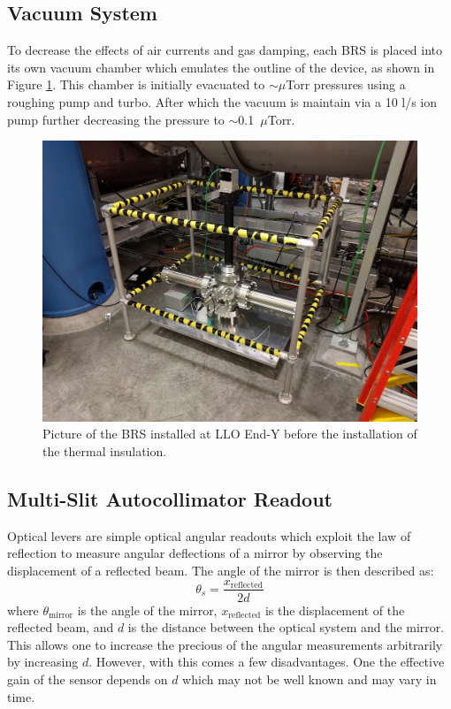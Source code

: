 \documentclass [12pt, proquest]{uwthesis}[2019]
\begin{document}
\subsection{Vacuum System}

To decrease the effects of air currents and gas damping, each BRS is placed into its own vacuum chamber which emulates the outline of the device, as shown in Figure \ref{BRSPic}. This chamber is initially evacuated to $\sim \mu$Torr pressures using a roughing pump and turbo. After which the vacuum is maintain via a 10 l/s ion pump further decreasing the pressure to $\sim$0.1~$\mu$Torr.

\begin{figure}[!h]
\begin{center}
 \includegraphics[width=\textwidth]{BRSPic.jpg}
\caption[Picture of an installed BRS]{Picture of the BRS installed at LLO End-Y before the installation of the thermal insulation.}
\label{BRSPic}
\end{center}
\end{figure}

\subsection{Multi-Slit Autocollimator Readout}

\quad Optical levers are simple optical angular readouts which exploit the law of reflection to measure angular deflections of a mirror by observing the displacement of a reflected beam. The angle of the mirror is then described as:
\begin{equation}
\theta_{s}=\frac{x_{\text{reflected}}}{2d}
\end{equation}
where $\theta_\text{mirror}$ is the angle of the mirror, $x_\text{reflected}$ is the displacement of the reflected beam, and $d$ is the distance between the optical system and the mirror. This allows one to increase the precious of the angular measurements arbitrarily by increasing $d$. However, with this comes a few disadvantages. One the effective gain of the sensor depends on $d$ which may not be well known and may vary in time.
\end{document}
